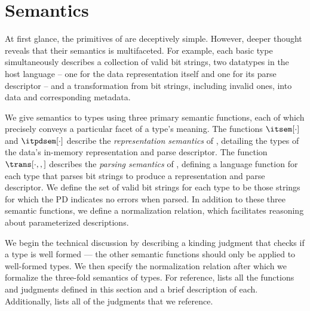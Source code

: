 \section{\ddc{} Semantics}
\label{sec:ddc-sem}


At first glance, the primitives of \ddc{} are deceptively simple.  
However, deeper thought reveals
that their semantics is multifaceted. For example, each basic type
simultaneously describes a
collection of valid bit strings, two datatypes in the host language --
one for the data representation itself and one for its parse
descriptor -- and a transformation from bit strings, including
invalid ones, into data and corresponding metadata. 


We give semantics to \ddc{} types using three primary
semantic functions, each
of which precisely conveys a particular facet of a type's meaning.
The functions $\itsem[\cdot]$ and $\itpdsem[\cdot]$ describe the {\it
  representation semantics} of \ddc{}, detailing the types of the
data's in-memory representation and parse descriptor. The function
$\trans[\cdot,,]$ describes the {\it parsing semantics} of \ddc{},
defining a \implang{} language function for each type that parses bit
strings to produce a representation and parse descriptor. We define
the set of valid bit strings for each type to be those strings for
which the PD indicates no errors when parsed.  In addition to these
three semantic functions, we define a normalization relation,
which facilitates reasoning about parameterized descriptions.

We begin the technical discussion by describing
a kinding judgment that checks if a type is well formed
--- the other semantic functions
should only be applied to well-formed \ddc{} types.
We then specify the normalization relation after which we formalize
the three-fold semantics of \ddc{} types.  For reference,
 lists all the functions and judgments defined
in this section and a brief description of each. Additionally,
 lists all of the \fomega{} judgments
that we reference.



